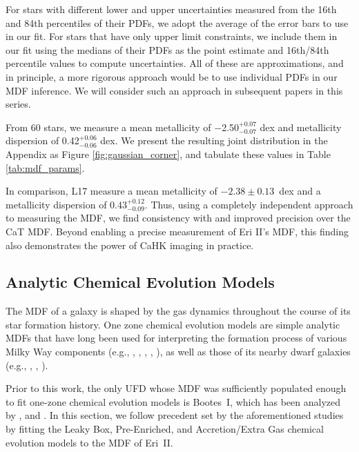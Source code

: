 \documentclass[twocolumn]{aastex63}
\newcommand{\met}	  {$-$2.50}	%
\newcommand{\metlerr} {0.07} %
\newcommand{\metuerr} {0.07} %
\newcommand{\metdisp}     {0.42} %
\newcommand{\metdisplerr} {0.06} %
\newcommand{\metdispuerr} {0.06} %
\begin{document}
\par For stars with different lower and upper uncertainties measured from the 16th and 84th percentiles of their PDFs, we adopt the average of the error bars to use in our fit. For stars that have only upper limit constraints, we include them in our fit using the medians of their PDFs as the point estimate and 16th/84th percentile values to compute uncertainties. All of these are approximations, and in principle, a more rigorous approach would be to use individual PDFs in our MDF inference. We will consider such an approach in subsequent papers in this series.

\par From 60 stars, we measure a mean metallicity of \met$^{+\metuerr}_{-\metlerr}$ dex and metallicity dispersion of \metdisp$^{+\metdispuerr}_{-\metdisplerr}$ dex. We present the resulting joint distribution in the Appendix as Figure \ref{fig:gaussian_corner}, and tabulate these values in Table \ref{tab:mdf_params}. 

\par In comparison, L17 measure a mean metallicity of $-2.38 \pm 0.13$~dex and a metallicity dispersion of $0.43^{+0.12}_{-0.09}$. Thus, using a completely independent approach to measuring the MDF, we find consistency with and improved precision over the CaT MDF. Beyond enabling a precise measurement of Eri II's MDF, this finding also demonstrates the power of CaHK imaging in practice.

\subsection{Analytic Chemical Evolution Models}
\label{sec:resultsanalytic}

\par The MDF of a galaxy is shaped by the gas dynamics throughout the course of its star formation history. One zone chemical evolution models are simple analytic MDFs that have long been used for interpreting the formation process of various Milky Way components (e.g., \citealt{schmidt1963}, \citealt{lynden-bell1975}, \citealt{pagelpatchett1975}, \citealt{hartwick1976}, \citealt{tinsley1980}), as well as those of its nearby dwarf galaxies (e.g., \citealt{helmi2006}, \citealt{kirby2013LZR}, \citealt{ross2015}). 

\par Prior to this work, the only UFD whose MDF was sufficiently populated enough to fit one-zone chemical evolution models is Bootes~I, which has been analyzed by \citet{jenkins2021vlt}, \citet{romano2015} and \citet{lai2011}. In this section, we follow precedent set by the aforementioned studies by fitting the Leaky Box, Pre-Enriched, and Accretion/Extra Gas chemical evolution models to the MDF of Eri~II. 
\end{document}

